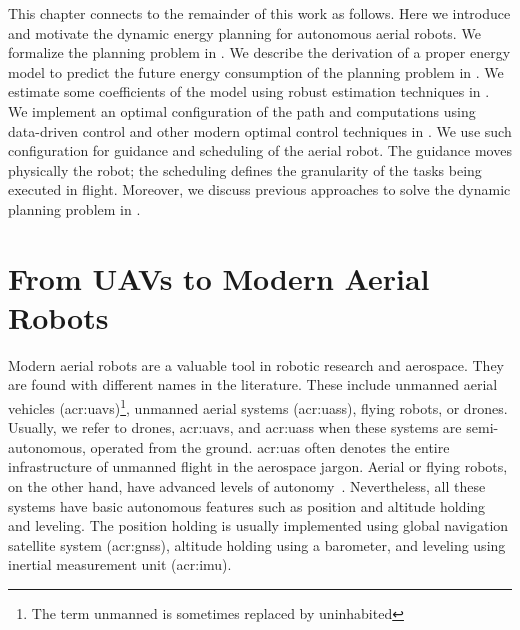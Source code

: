This chapter connects to the remainder of this work as follows. Here we introduce and motivate the dynamic energy planning for autonomous aerial robots. We formalize the planning problem in . We describe the derivation of a proper energy model to predict the future energy consumption of the planning problem in . We estimate some coefficients of the model using robust estimation techniques in . We implement an optimal configuration of the path and computations using data-driven control and other modern optimal control techniques in . We use such configuration for guidance and scheduling of the aerial robot. The guidance moves physically the robot; the scheduling defines the granularity of the tasks being executed in flight. Moreover, we discuss previous approaches to solve the dynamic planning problem in . 


\section{From UAVs to Modern Aerial Robots}

Modern aerial robots are a valuable tool in robotic research and aerospace. They are found with different names in the literature. These include unmanned aerial vehicles (\Gls{acr:uav}s)\footnote{The term unmanned is sometimes replaced by uninhabited}, unmanned aerial systems (\Gls{acr:uas}s), flying robots, or drones. Usually, we refer to drones, \Gls{acr:uav}s, and \Gls{acr:uas}s when these systems are semi-autonomous, operated from the ground. \Gls{acr:uas} often denotes the entire infrastructure of unmanned flight in the aerospace jargon. Aerial or flying robots, on the other hand, have advanced levels of autonomy~\citep{siciliano2016springer}. Nevertheless, all these systems have basic autonomous features such as position and altitude holding and leveling. The position holding is usually implemented using global navigation satellite system (\Gls{acr:gnss}), altitude holding using a barometer, and leveling using inertial measurement unit (\Gls{acr:imu}).

